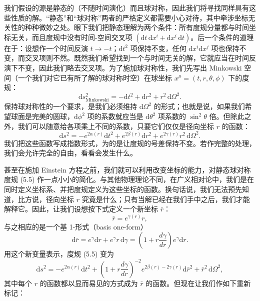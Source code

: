 我们假设的源是静态的（不随时间演化）而且球对称，因此我们将寻找同样具有这些性质的解。“静态”和“球对称”两者的严格定义都需要小心对待，其中牵涉坐标无关性的种种微妙之处。眼下我们把静态理解为两个条件：所有度规分量都与时间坐标无关，而且度规中没有时间-空间交叉项 $(\mathrm{d}t\,\mathrm{d}x^i + \mathrm{d}x^i\,\mathrm{d}t)$。后一个条件的道理在于：设想作一个时间反演 $t \to -t$；$\mathrm{d}t^2$ 项保持不变，任何 $\mathrm{d}x^i\mathrm{d}x^j$ 项也保持不变，而交叉项则不然。既然我们希望找到一个与时间无关的解，它就应当在时间反演下不变，因此我们略去交叉项。为了施加球对称性，我们先写出 Minkowski 空间（一个我们对它已有所了解的球对称时空）在球坐标 $x^\mu = (t, r, \theta, \phi)$ 下的度规：
\begin{equation*}
\mathrm{d}s^2_{\mathrm{Minkowski}} = -\mathrm{d}t^2 + \mathrm{d}r^2 + r^2\,\mathrm{d}\Omega^2.
\tag{5.4}
\end{equation*}
保持球对称性的一个要求，是我们必须维持 $\mathrm{d}\Omega^2$ 的形式；也就是说，如果我们希望球面是完美的圆球，$\mathrm{d}\phi^2$ 项的系数就应当是 $\mathrm{d}\theta^2$ 项系数的 $\sin^2\theta$ 倍。但除此之外，我们可以随意给各项乘上不同的系数，只要它们仅仅是径向坐标 $r$ 的函数：
\begin{equation*}
\mathrm{d}s^2 = -e^{2\alpha(r)}\mathrm{d}t^2 + e^{2\beta(r)}\mathrm{d}r^2 + e^{2\gamma(r)}r^2\,\mathrm{d}\Omega^2.
\tag{5.5}
\end{equation*}
我们把这些函数写成指数形式，为的是让度规的号差保持不变。若作完整的处理，我们会允许完全的自由，看看会发生什么。

甚至在施加 Einstein 方程之前，我们就可以利用改变坐标的能力，对静态球对称度规 (5.5) 作一点小小的简化。与其他物理理论不同，在广义相对论中，我们是在同时定义坐标系、并把度规定义为这些坐标的函数。换句话说，我们无法预先知道，比方说，径向坐标 $r$ 究竟是什么；只有当解已经在我们手中之后，我们才能解释它。因此，让我们设想按下式定义一个新坐标 $\bar{r}$：
\begin{equation*}
\bar{r} = e^{\gamma(r)}r,
\tag{5.6}
\end{equation*}
与之相应的是一个基 1-形式（basis one-form）
\begin{equation*}
\mathrm{d}\bar{r} = e^{\gamma}\mathrm{d}r + e^{\gamma}r\,\mathrm{d}\gamma = \left(1 + r\frac{d\gamma}{dr}\right)e^{\gamma}\mathrm{d}r.
\tag{5.7}
\end{equation*}
用这个新变量表示，度规 (5.5) 变为
\begin{equation*}
\mathrm{d}s^2 = -e^{2\alpha(r)}\mathrm{d}t^2 + \left(1 + r\frac{d\gamma}{dr}\right)^{-2}e^{2\beta(r)-2\gamma(r)}\mathrm{d}\bar{r}^2 + \bar{r}^2\,\mathrm{d}\Omega^2,
\tag{5.8}
\end{equation*}
其中每个 $r$ 的函数都以显而易见的方式成为 $\bar{r}$ 的函数。但现在让我们作如下重新标记：

